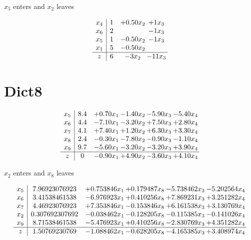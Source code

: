 \documentclass[12pt]{article}
\begin{document}
 $ x_5 $ enters and $ x_2 $ leaves 

 \[\begin{array}{c| c c@{\hskip 2pt} c@{\hskip 2pt} }
 x_4   &  1 & + 0.5  0 x_2 & + 1 x_3\\
 x_6   &  2  &   & -1 x_3\\
 x_5   &  1 & -0.5  0 x_2 & -1 x_3\\
 x_1   &  5 & -0.5  0 x_2 &   \\
\hline
z    &  6 & -3 x_2 & -11 x_3\\
\end{array}\]

\section{Dict8}
\[\begin{array}{c| c c@{\hskip 2pt} c@{\hskip 2pt} c@{\hskip 2pt} c@{\hskip 2pt} }
 x_5   &  8.4 & + 0.7  0 x_1 & -1.4  0 x_2 & -5.9  0 x_3 & -5.4  0 x_4\\
 x_6   &  4.4 & -7.1  0 x_1 & -3.2  0 x_2 & + 7.5  0 x_3 & + 2.8  0 x_4\\
 x_7   &  4.1 & + 7.4  0 x_1 & + 1.2  0 x_2 & + 6.3  0 x_3 & + 3.3  0 x_4\\
 x_8   &  2.4 & -0.3  0 x_1 & -7.8  0 x_2 & -0.9  0 x_3 & -1.1  0 x_4\\
 x_9   &  9.7 & -5.6  0 x_1 & -3.2  0 x_2 & -3.2  0 x_3 & + 3.9  0 x_4\\
\hline
z    &  0 & -0.9  0 x_1 & + 4.9  0 x_2 & -3.6  0 x_3 & + 4.1  0 x_4\\
\end{array}\]


 $ x_2 $ enters and $ x_8 $ leaves 

 \[\begin{array}{c| c c@{\hskip 2pt} c@{\hskip 2pt} c@{\hskip 2pt} c@{\hskip 2pt} }
 x_5   &  7.96923076923 & + 0.753846 x_1 & + 0.179487 x_8 & -5.738462 x_3 & -5.202564 x_4\\
 x_6   &  3.41538461538 & -6.976923 x_1 & + 0.410256 x_8 & + 7.869231 x_3 & + 3.251282 x_4\\
 x_7   &  4.46923076923 & + 7.353846 x_1 & -0.153846 x_8 & + 6.161538 x_3 & + 3.130769 x_4\\
 x_2   &  0.307692307692 & -0.038462 x_1 & -0.128205 x_8 & -0.115385 x_3 & -0.141026 x_4\\
 x_9   &  8.71538461538 & -5.476923 x_1 & + 0.410256 x_8 & -2.830769 x_3 & + 4.351282 x_4\\
\hline
z    &  1.50769230769 & -1.088462 x_1 & -0.628205 x_8 & -4.165385 x_3 & + 3.408974 x_4\\
\end{array}\]
\end{document}

